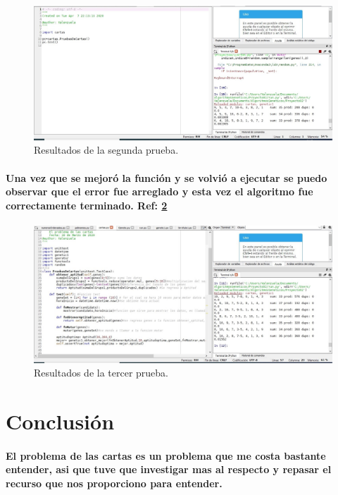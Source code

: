 \documentclass[10pt,a4paper]{article}
\begin{document}
\begin{figure}[H]
\includegraphics[scale=0.4] {segundaprueba.jpg}
\caption{Resultados de la segunda prueba.}
\label{fig:cod2}
\end{figure}


\paragraph{Una vez que se mejor\'o la funci\'on y se volvi\'o a ejecutar se puedo observar que el error fue arreglado y esta vez el algoritmo fue correctamente terminado. Ref: \ref{fig:cod3}
}

\begin{figure}[H]
\includegraphics[scale=0.4] {TercerPrueba.jpg}
\caption{Resultados de la tercer prueba.}
\label{fig:cod3}
\end{figure}




\section{Conclusi\'on}
\paragraph{El problema de las cartas es un problema que me costa bastante entender, asi que tuve que investigar mas al respecto y repasar el recurso que nos proporciono para entender.}
\end{document}
